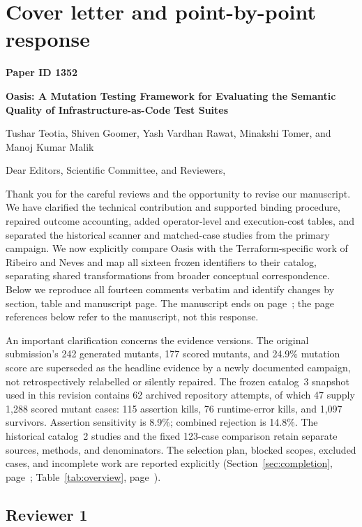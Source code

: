 \section*{Cover letter and point-by-point response}\label{sec:response}
\noindent\textbf{Paper ID 1352}\par
\noindent\textbf{Oasis: A Mutation Testing Framework for Evaluating the Semantic Quality of Infrastructure-as-Code Test Suites}\par
\noindent Tushar Teotia, Shiven Goomer, Yash Vardhan Rawat, Minakshi Tomer, and Manoj Kumar Malik\par
\medskip
\noindent Dear Editors, Scientific Committee, and Reviewers,

Thank you for the careful reviews and the opportunity to revise our manuscript. We have clarified the technical contribution and supported binding procedure, repaired outcome accounting, added operator-level and execution-cost tables, and separated the historical scanner and matched-case studies from the primary campaign. We now explicitly compare Oasis with the Terraform-specific work of Ribeiro and Neves and map all sixteen frozen identifiers to their catalog, separating shared transformations from broader conceptual correspondence. Below we reproduce all fourteen comments verbatim and identify changes by section, table and manuscript page. The manuscript ends on page~\pageref{lastmanuscriptpage}; the page references below refer to the manuscript, not this response.

An important clarification concerns the evidence versions. The original submission's 242 generated mutants, 177 scored mutants, and 24.9\% mutation score are superseded as the headline evidence by a newly documented campaign, not retrospectively relabelled or silently repaired. The frozen catalog~3 snapshot used in this revision contains 62 archived repository attempts, of which 47 supply 1,288 scored mutant cases: 115 assertion kills, 76 runtime-error kills, and 1,097 survivors. Assertion sensitivity is 8.9\%; combined rejection is 14.8\%. The historical catalog~2 studies and the fixed 123-case comparison retain separate sources, methods, and denominators. The selection plan, blocked scopes, excluded cases, and incomplete work are reported explicitly (Section~\ref{sec:completion}, page~\pageref{sec:completion}; Table~\ref{tab:overview}, page~\pageref{tab:overview}).

\subsection*{Reviewer 1}

